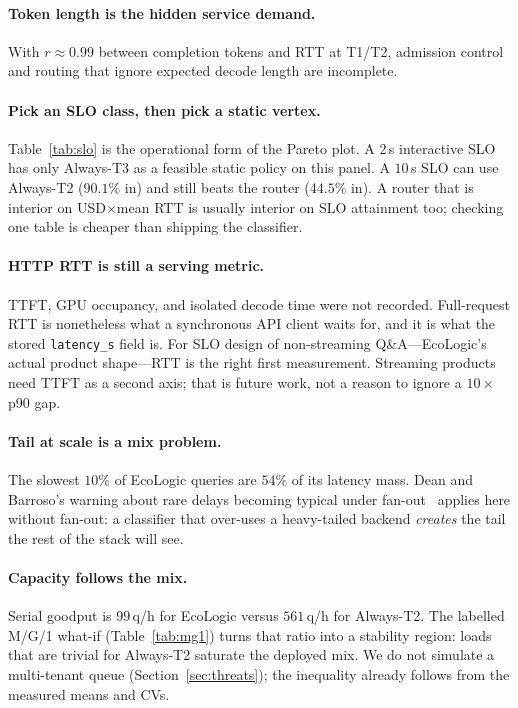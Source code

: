 \documentclass[10pt,conference]{IEEEtran}
\begin{document}
\paragraph{Token length is the hidden service demand.}
With $r\approx 0.99$ between completion tokens and RTT at T1/T2, admission control and routing that ignore expected decode length are incomplete.

\paragraph{Pick an SLO class, then pick a static vertex.}
Table~\ref{tab:slo} is the operational form of the Pareto plot. A $2$\,s interactive SLO has only Always-T3 as a feasible static policy on this panel. A $10$\,s SLO can use Always-T2 ($90.1\%$ in) and still beats the router ($44.5\%$ in). A router that is interior on USD$\times$mean RTT is usually interior on SLO attainment too; checking one table is cheaper than shipping the classifier.

\paragraph{HTTP RTT is still a serving metric.}
TTFT, GPU occupancy, and isolated decode time were not recorded. Full-request RTT is nonetheless what a synchronous API client waits for, and it is what the stored \texttt{latency\_s} field is. For SLO design of non-streaming Q\&A---EcoLogic's actual product shape---RTT is the right first measurement. Streaming products need TTFT as a second axis; that is future work, not a reason to ignore a $10\times$ p90 gap.

\paragraph{Tail at scale is a mix problem.}
The slowest $10\%$ of EcoLogic queries are $54\%$ of its latency mass. Dean and Barroso's warning about rare delays becoming typical under fan-out~\cite{dean2013tail} applies here without fan-out: a classifier that over-uses a heavy-tailed backend \emph{creates} the tail the rest of the stack will see.

\paragraph{Capacity follows the mix.}
Serial goodput is $99$\,q/h for EcoLogic versus $561$\,q/h for Always-T2. The labelled M/G/1 what-if (Table~\ref{tab:mg1}) turns that ratio into a stability region: loads that are trivial for Always-T2 saturate the deployed mix. We do not simulate a multi-tenant queue (Section~\ref{sec:threats}); the inequality already follows from the measured means and CVs.
\end{document}
